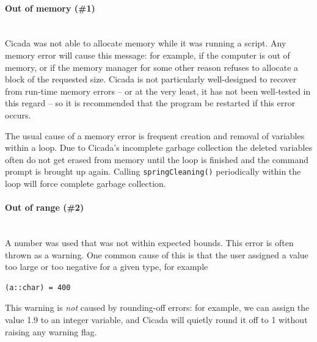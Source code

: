 \documentclass{article}
\newenvironment{code}{
       \begin{list}{}{
               \setlength{\leftmargin}{.4in}
               \setlength{\rightmargin}{0in}
               \setlength{\topsep}{.2in}
       }
       \small
       \item[] }
       { \end{list}   }
\begin{document}
\paragraph{Out of memory (\#1)\\\\}

Cicada was not able to allocate memory while it was running a script.  Any memory error will cause this message:  for example, if the computer is out of memory, or if the memory manager for some other reason refuses to allocate a block of the requested size.  Cicada is not particularly well-designed to recover from run-time memory errors -- or at the very least, it has not been well-tested in this regard -- so it is recommended that the program be restarted if this error occurs.

The usual cause of a memory error is frequent creation and removal of variables within a loop.  Due to Cicada's incomplete garbage collection the deleted variables often do not get erased from memory until the loop is finished and the command prompt is brought up again.  Calling \verb#springCleaning()# periodically within the loop will force complete garbage collection.\\




\paragraph{Out of range (\#2)\\\\}

A number was used that was not within expected bounds.  This error is often thrown as a warning.  One common cause of this is that the user assigned a value too large or too negative for a given type, for example

\begin{code} \begin{verbatim}
(a::char) = 400
\end{verbatim} \end{code}

\noindent This warning is \emph{not} caused by rounding-off errors:  for example, we can assign the value 1.9 to an integer variable, and Cicada will quietly round it off to 1 without raising any warning flag.
\end{document}
